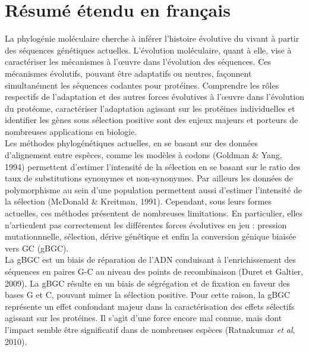\section*{Résumé étendu en français}

La phylogénie moléculaire cherche à inférer l’histoire évolutive du vivant à partir des séquences génétiques actuelles.
L'évolution moléculaire, quant à elle, vise à caractériser les mécanismes à l’œuvre dans l'évolution des séquences.
Ces mécanismes évolutifs, pouvant être adaptatifs ou neutres, façonnent simultanément les séquences codantes pour protéines.
Comprendre les rôles respectifs de l'adaptation et des autres forces évolutives à l’œuvre dans l'évolution du protéome, caractériser l'adaptation agissant sur les protéines individuelles et identifier les gènes sous sélection positive sont des enjeux majeurs et porteurs de nombreuses applications en biologie. \\

Les méthodes phylogénétiques actuelles, en se basant sur des données d'alignement entre espèces, comme les modèles à codons (Goldman \& Yang, 1994) permettent d'estimer l'intensité de la sélection en se basant sur le ratio des taux de substitutions synonymes et non-synonymes.
Par ailleurs les données de polymorphisme au sein d'une population permettent aussi d'estimer l'intensité de la sélection (McDonald \& Kreitman, 1991).
Cependant, sous leurs formes actuelles, ces méthodes présentent de nombreuses limitations.
En particulier, elles n'articulent pas correctement les différentes forces évolutives en jeu : pression mutationnnelle, sélection, dérive génétique et enfin la conversion génique biaisée vers GC (gBGC).\\

La gBGC est un biais de réparation de l'ADN conduisant à l'enrichissement des séquences en paires G-C au niveau des points de recombinaison (Duret et Galtier, 2009).
La gBGC résulte en un biais de ségrégation et de fixation en faveur des bases G et C, pouvant mimer la sélection positive.
Pour cette raison, la gBGC représente un effet confondant majeur dans la caractérisation des effets sélectifs agissant sur les protéines.
Il s'agit d'une force encore mal connue, mais dont l’impact semble être significatif dans de nombreuses espèces (Ratnakumar\textit{ et al}, 2010). \\

